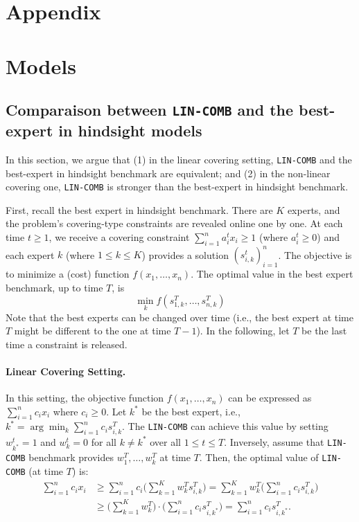 
\section*{Appendix}

\section{Models}


\subsection{Comparaison between \texttt{LIN-COMB} and the best-expert in hindsight models}		\label{sec:comparaison}
In this section, we argue that (1) in the linear covering setting, \texttt{LIN-COMB} and the best-expert in hindsight benchmark are equivalent;
and (2) in the non-linear covering one,  \texttt{LIN-COMB} is stronger than the best-expert in hindsight benchmark. 

First, recall the best expert in hindsight benchmark. There are $K$ experts, and the problem's covering-type constraints are revealed online one by one.
At each time $t \geq 1$, we receive a covering constraint $\sum_{i=1}^{n} a_{i}^{t} x_{i} \geq 1$ (where $a_{i}^{t} \geq 0$) and each expert $k$ (where $1 \leq k \leq K$) provides
a solution $(s_{i,k}^{t})_{i=1}^{n}$. The objective is to minimize a (cost) function $f(x_{1}, \ldots, x_{n})$. The optimal value in the best expert benchmark, up to time $T$, is 
$$
\min_{k} f(s_{1,k}^{T}, \ldots, s_{n,k}^{T})
$$
%
Note that the best experts can be changed over time (i.e., the best expert at time $T$ might be different to the one at time $T-1$).
In the following, let $T$ be the last time a constraint is released. 

\paragraph{Linear Covering Setting.} In this setting, the objective function $f(x_{1}, \ldots, x_{n})$ can be expressed as $\sum_{i=1}^{n} c_{i} x_{i}$ where $c_{i} \geq 0$.
Let $k^{*}$ be the best expert, i.e., $k^{*} = \arg \min_{k} \sum_{i=1}^{n} c_{i} s_{i,k}^{T}$. The \texttt{LIN-COMB} can achieve this value by setting 
$w_{k^{*}}^{t} = 1$ and $w_{k}^{t} = 0$ for all $k \neq k^{*}$ over all $1 \leq t \leq T$. Inversely, assume that \texttt{LIN-COMB} benchmark provides $w_{1}^{T}, \ldots, w_{k}^{T}$
at time $T$. Then, the optimal value of \texttt{LIN-COMB} (at time $T$) is:
\begin{align*}
\sum_{i=1}^{n} c_{i} x_{i} &\geq \sum_{i=1}^{n} c_{i} \biggl( \sum_{k=1}^{K} w_{k}^{T} s_{i,k}^{T} \biggr)
= \sum_{k=1}^{K} w_{k}^{T}  \biggl( \sum_{i=1}^{n} c_{i} s_{i,k}^{T} \biggr) \\
%
&\geq \biggl ( \sum_{k=1}^{K} w_{k}^{T} \biggr) \cdot \biggl( \sum_{i=1}^{n} c_{i} s_{i,k^{*}}^{T} \biggr)
=  \sum_{i=1}^{n} c_{i} s_{i,k^{*}}^{T}.
\end{align*}

